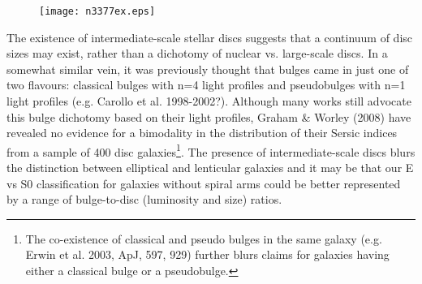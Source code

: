 \documentclass[12pt,preprint]{nature}
\begin{document}
\begin{figure}
\texttt{[image: n3377ex.eps]}
\caption{
}
\label{fig:n3377ex}
\end{figure}

The existence of intermediate-scale stellar discs suggests that a continuum of disc sizes may exist, rather than a dichotomy of nuclear vs. large-scale discs.  
In a somewhat similar vein, it was previously thought that bulges came in just one of two flavours: 
classical bulges with n=4 light profiles and pseudobulges with n=1 light profiles (e.g. Carollo et al. 1998-2002?).  
Although many works still advocate this bulge dichotomy based on their light profiles, Graham \& Worley (2008) have revealed no 
evidence for a bimodality in the distribution of their Sersic indices from a sample of 400 disc 
galaxies\footnote{The co-existence of classical and pseudo bulges in the same galaxy (e.g. Erwin et al. 2003, ApJ, 597, 929) 
further blurs claims for galaxies having either a classical bulge or a pseudobulge.}.   
The presence of intermediate-scale discs blurs the distinction between elliptical and lenticular galaxies and it may be that our E vs S0 
classification for galaxies without spiral arms could be better represented by a range of bulge-to-disc (luminosity and size) ratios. 






\end{document}
